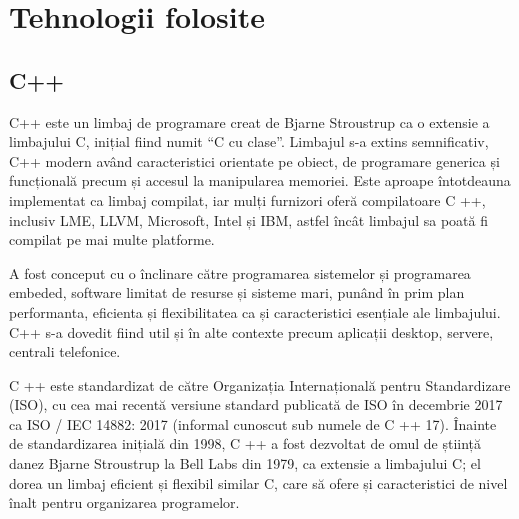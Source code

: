 \newpage
\section{Tehnologii folosite}
\subsection{C++}

C++ este un limbaj de programare creat de Bjarne Stroustrup ca o extensie a limbajului C, inițial fiind numit “C cu clase”. Limbajul s-a extins semnificativ, C++ modern având caracteristici orientate pe obiect, de programare generica și funcțională precum și accesul la manipularea memoriei. Este aproape întotdeauna implementat ca limbaj compilat, iar mulți furnizori oferă compilatoare C ++, inclusiv LME, LLVM, Microsoft, Intel și IBM, astfel încât limbajul sa poată fi compilat pe mai multe platforme. 

A fost conceput cu o înclinare către programarea sistemelor și programarea embeded, software limitat de resurse și sisteme mari, punând în prim plan performanta, eficienta și flexibilitatea ca și caracteristici esențiale ale limbajului. C++ s-a dovedit fiind util și în alte contexte precum aplicații desktop, servere, centrali telefonice.

C ++ este standardizat de către Organizația Internațională pentru Standardizare (ISO), cu cea mai recentă versiune standard publicată de ISO în decembrie 2017 ca ISO / IEC 14882: 2017 (informal cunoscut sub numele de C ++ 17). Înainte de standardizarea inițială din 1998, C ++ a fost dezvoltat de omul de știință danez Bjarne Stroustrup la Bell Labs din 1979, ca extensie a limbajului C; el dorea un limbaj eficient și flexibil similar C, care să ofere și caracteristici de nivel înalt pentru organizarea programelor.
